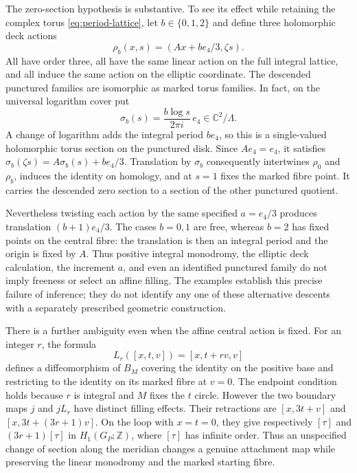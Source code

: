 The zero-section hypothesis is substantive. To see its effect while
retaining the complex torus \eqref{eq:period-lattice}, let
$b\in\{0,1,2\}$ and define three holomorphic deck actions
\begin{equation}\label{eq:affine-ambiguity}
 \rho_b(x,s)=(Ax+be_4/3,\zeta s).
\end{equation}
All have order three, all have the same linear action on the full
integral lattice, and all induce the same action on the elliptic
coordinate. The descended punctured families are isomorphic as
marked torus families. In fact, on the universal logarithm cover put
\[
 \sigma_b(s)=\frac{b\log s}{2\pi i}\,e_4\in\mathbb C^2/\Lambda.
\]
A change of logarithm adds the integral period $be_4$, so this is a
single-valued holomorphic torus section on the punctured disk.
Since $Ae_4=e_4$, it satisfies
$\sigma_b(\zeta s)=A\sigma_b(s)+be_4/3$.
Translation by $\sigma_b$ consequently intertwines $\rho_0$ and
$\rho_b$, induces the identity on homology, and at $s=1$ fixes the
marked fibre point. It carries the descended zero section to a
section of the other punctured quotient.

Nevertheless twisting each action by the same specified $a=e_4/3$
produces translation $(b+1)e_4/3$. The cases $b=0,1$ are free,
whereas $b=2$ has fixed points on the central fibre: the translation
is then an integral period and the origin is fixed by $A$.
Thus positive integral monodromy, the elliptic deck calculation,
the increment $a$, and even an identified punctured family do not
imply freeness or select an affine filling. The examples establish
this precise failure of inference; they do not identify any one
of these alternative descents with a separately prescribed geometric
construction.

There is a further ambiguity even when the affine central action is
fixed. For an integer $r$, the formula
\[
 L_r([x,t,v])=[x,t+rv,v]
\]
defines a diffeomorphism of $B_M$ covering the identity on the
positive base and restricting to the identity on its marked fibre
at $v=0$. The endpoint condition holds because $r$ is integral
and $M$ fixes the $t$ circle. However the two boundary maps $j$
and $jL_r$ have distinct filling effects. Their retractions are
$[x,3t+v]$ and $[x,3t+(3r+1)v]$.
On the loop with $x=t=0$, they give respectively $[\tau]$ and
$(3r+1)[\tau]$ in $H_1(G_P;\mathbb Z)$, where $[\tau]$ has
infinite order. Thus an unspecified change of section along the
meridian changes a genuine attachment map while preserving the
linear monodromy and the marked starting fibre.

